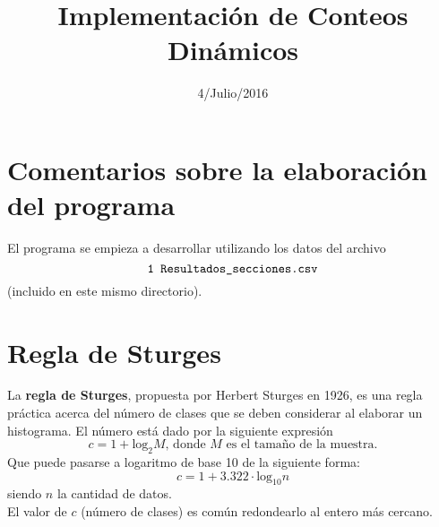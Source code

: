 \documentclass[12pt]{article}
\title{Implementaci\'on de Conteos Din\'amicos}
\date{4/Julio/2016}
\begin{document}
\maketitle
\section*{Comentarios sobre la elaboraci\'on del programa}
El programa se empieza a desarrollar utilizando los datos del 
archivo 
$$
\mbox{\tt 1 Resultados$\_$secciones.csv} 
$$
(incluido en este mismo directorio).
\section*{Regla de Sturges}
La {\bf regla de Sturges}, propuesta por Herbert Sturges en 1926, es una 
regla pr\'actica acerca del n\'umero de clases que se deben considerar 
al elaborar un histograma. El n\'umero est\'a dado por la siguiente 
expresi\'on
$$
c=1+\mbox{log}_{2}M\mbox{, donde $M$ es el tama\~no de la muestra.}
$$
Que puede pasarse a logaritmo de base 10 de la siguiente forma:
$$
c=1+3.322\cdot\mbox{log}_{10}n
$$
siendo $n$ la cantidad de datos.\\
El valor de $c$ (n\'umero de clases) es com\'un redondearlo al entero 
m\'as cercano.
\end{document}

